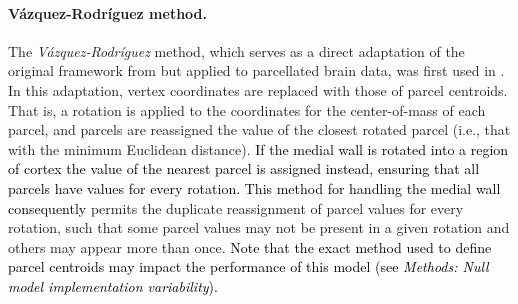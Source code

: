 \documentclass[12pt,aps,pra,reprint,showkeys]{revtex4-1}
\newcommand{\nimg}[1]{\textcolor{black}{{#1}}}
\begin{document}
\paragraph*{V{\'a}zquez-Rodr{\'i}guez method.}
The \textit{V{\'a}zquez-Rodr{\'i}guez} method, which serves as a direct adaptation of the original framework from \citet{alexanderbloch2018neuroimage} but applied to parcellated brain data, was first used in \citet{vazquezrodriguez2019pnas}.
In this adaptation, vertex coordinates are replaced with those of parcel centroids.
That is, a rotation is applied to the coordinates for the center-of-mass of each parcel, and parcels are reassigned the value of the closest rotated parcel (i.e., that with the minimum Euclidean distance).
\nimg{If the medial wall is rotated into a region of cortex the value of the nearest parcel is assigned instead, ensuring that all parcels have values for every rotation.
This method for handling the medial wall consequently} permits the duplicate reassignment of parcel values for every rotation, such that some parcel values may not be present in a given rotation and others may appear more than once.
\nimg{Note that the exact method used to define parcel centroids may impact the performance of this model (see \textit{Methods: Null model implementation variability}).}
\end{document}

